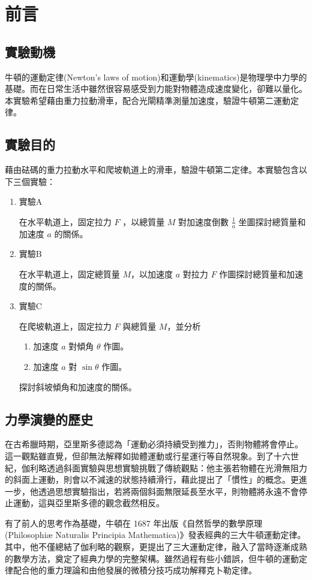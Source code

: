 \documentclass[11pt,a4paper]{article}
\theoremstyle{definition}
\begin{document}
    \section{前言}

        \subsection{實驗動機}
            牛頓的運動定律(Newton's laws of motion)和運動學(kinematics)是物理學中力學的基礎。而在日常生活中雖然很容易感受到力能對物體造成速度變化，卻難以量化。本實驗希望藉由重力拉動滑車，配合光閘精準測量加速度，驗證牛頓第二運動定律。
            
        \subsection{實驗目的}
            藉由砝碼的重力拉動水平和爬坡軌道上的滑車，驗證牛頓第二定律。本實驗包含以下三個實驗：

            \begin{enumerate}
                \item 實驗A\par
                在水平軌道上，固定拉力 $F$ ，以總質量 $M$ 對加速度倒數 $\frac{1}{a}$ 坐圖探討總質量和加速度 $a$ 的關係。
                \item 實驗B\par
                在水平軌道上，固定總質量 $M$，以加速度 $a$ 對拉力 $F$ 作圖探討總質量和加速度的關係。
                \item 實驗C\par
                在爬坡軌道上，固定拉力 $F$ 與總質量 $M$，並分析
                    \begin{enumerate}
                        \item 加速度 $a$ 對傾角 $\theta$ 作圖。
                        \item 加速度 $a$ 對 $\sin\theta$ 作圖。
                    \end{enumerate}
                探討斜坡傾角和加速度的關係。
            \end{enumerate}

        \subsection{力學演變的歷史}

            在古希臘時期，亞里斯多德認為「運動必須持續受到推力」，否則物體將會停止。這一觀點雖直覺，但卻無法解釋如拋體運動或行星運行等自然現象。到了十六世紀，伽利略透過斜面實驗與思想實驗挑戰了傳統觀點：他主張若物體在光滑無阻力的斜面上運動，則會以不減速的狀態持續滑行，藉此提出了「慣性」的概念。更進一步，他透過思想實驗指出，若將兩個斜面無限延長至水平，則物體將永遠不會停止運動，這與亞里斯多德的觀念截然相反。
            \par 有了前人的思考作為基礎，牛頓在 1687 年出版《自然哲學的數學原理 (Philosophiæ Naturalis Principia Mathematica)》\cite{newton:1687}發表經典的三大牛頓運動定律。其中，他不僅總結了伽利略的觀察，更提出了三大運動定律，融入了當時逐漸成熟的數學方法，奠定了經典力學的完整架構。雖然過程有些小錯誤，但牛頓的運動定律配合他的重力理論和由他發展的微積分技巧成功解釋克卜勒定律。
\end{document}

